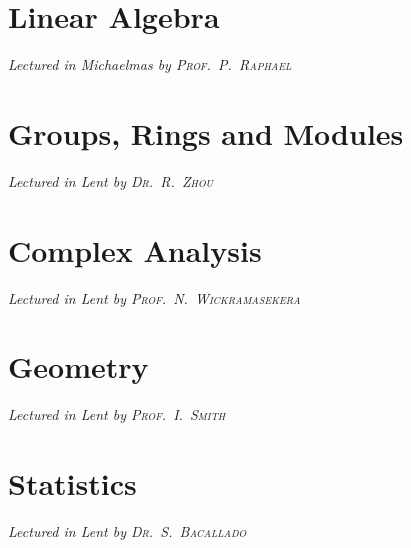 \chapter[Linear Algebra \\ \textnormal{\emph{Lectured in Michaelmas \oldstylenums{2021} by \textsc{Prof.\ P.\ Raphael}}}]{Linear Algebra}
\emph{\Large Lectured in Michaelmas  by \textsc{Prof.\ P.\ Raphael}}


\chapter[Groups, Rings and Modules \\ \textnormal{\emph{Lectured in Lent \oldstylenums{2022} by \textsc{Dr.\ R.\ Zhou}}}]{Groups, Rings and Modules}
\emph{\Large Lectured in Lent  by \textsc{Dr.\ R.\ Zhou}}


\chapter[Complex Analysis \\ \textnormal{\emph{Lectured in Lent \oldstylenums{2022} by \textsc{Prof.\ N.\ Wickramasekera}}}]{Complex Analysis}
\emph{\Large Lectured in Lent  by \textsc{Prof.\ N.\ Wickramasekera}}


\chapter[Geometry \\ \textnormal{\emph{Lectured in Lent \oldstylenums{2022} by \textsc{Prof.\ I.\ Smith}}}]{Geometry}
\emph{\Large Lectured in Lent  by \textsc{Prof.\ I.\ Smith}}


\chapter[Statistics \\ \textnormal{\emph{Lectured in Lent \oldstylenums{2022} by \textsc{Dr.\ S.\ Bacallado}}}]{Statistics}
\emph{\Large Lectured in Lent  by \textsc{Dr.\ S.\ Bacallado}}



